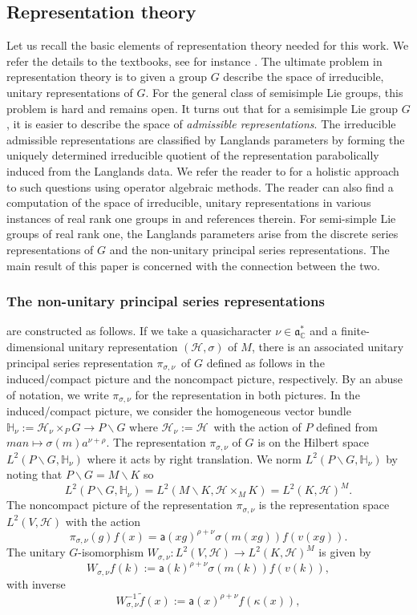 \documentclass[a4paper,reqno]{amsart}
\numberwithin{equation}{section}
\def\C{\mathbb{C}}
\theoremstyle{definition}
\theoremstyle{remark}
\begin{document}
\subsection{Representation theory}

Let us recall the basic elements of representation theory needed for this work. We refer the details to the textbooks, see for instance \cite{knappbook, wallachbook,wallachbookII}. The ultimate problem in representation theory is to given a group $G$ describe the space of irreducible, unitary representations of $G$. For the general class of semisimple Lie groups, this problem is hard and remains open. It turns out that for a semisimple Lie group $G$, it is easier to describe the space of \emph{admissible representations}. The irreducible admissible representations are classified by Langlands parameters by forming the uniquely determined irreducible quotient of the representation parabolically induced from the Langlands data. We refer the reader to \cite{afgomackey,clareetalI,clareetalII} for a holistic approach to such questions using operator algebraic methods. The reader can also find a computation of the space of irreducible, unitary representations in various instances of real rank one groups in \cite{foxhaskell,prudhon} and references therein. For semi-simple Lie groups of real rank one, the Langlands parameters arise from the discrete series representations of $G$ and the non-unitary principal series representations. The main result of this paper is concerned with the connection between the two.


\subsubsection{The non-unitary principal series representations} 
\label{subsubnonut}
are constructed as follows. If we take a quasicharacter $\nu\in \mathfrak{a}^*_\C$ and a finite-dimensional unitary representation $(\mathcal{H},\sigma)$ of $M$, there is an associated unitary principal series representation $\pi_{\sigma,\nu}$ of $G$ defined as follows in the induced/compact picture and the noncompact picture, respectively. By an abuse of notation, we write $\pi_{\sigma,\nu}$ for the representation in both pictures. In the induced/compact picture, we consider the homogeneous vector bundle $\mathbb{H}_\nu:=\mathcal{H}_\nu\times_P G\to P\backslash G$ where $\mathcal{H}_\nu:=\mathcal{H}$ with the action of $P$ defined from $man\mapsto \sigma(m)a^{\nu+\rho}$. The representation $\pi_{\sigma,\nu}$ of $G$ is on the Hilbert space $L^2(P\backslash G,\mathbb{H}_\nu)$ where it acts by right translation. We norm $L^2(P\backslash G,\mathbb{H}_\nu)$ by noting that $P\backslash G=M\backslash K$ so 
$$L^2(P\backslash G,\mathbb{H}_\nu)=L^2(M\backslash K,\mathcal{H}\times_MK)=L^2(K,\mathcal{H})^M.$$
The noncompact picture of the representation $\pi_{\sigma,\nu}$ is the representation space $L^2(V,\mathcal{H})$ with the action
$$\pi_{\sigma,\nu}(g)f(x)=\mathsf{a}(xg)^{\rho +\nu}\sigma(m(xg))f(v(xg)).$$
The unitary $G$-isomorphism $W_{\sigma,\nu}:L^2(V,\mathcal{H})\to L^2(K,\mathcal{H})^M$ is given by 
$$W_{\sigma,\nu}f(k):=\mathsf{a}(k)^{\rho +\nu}\sigma(m(k))f(v(k)),$$
with inverse
$$W_{\sigma,\nu}^{-1}\tilde{f}(x):=\mathsf{a}(x)^{\rho +\nu}f(\kappa(x)),$$
\end{document}
